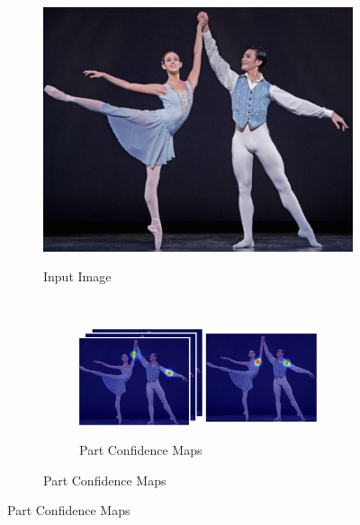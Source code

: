 \begin{figure}[t!]
  \begin{subfigure}[t]{0.24\textwidth}
    \includegraphics[width=0.9\linewidth]{img/openpose_pipeline_a}
    \label{fig:oppA}
    \caption{Input Image}
  \end{subfigure}%
  ~
  \begin{subfigure}[t]{0.24\textwidth}
    \centering
    \begin{subfigure}[b]{1\textwidth}
      \includegraphics[width=0.9\linewidth]{img/openpose_pipeline_b}
      \label{fig:oppB}
      \caption{Part Confidence Maps}
    \end{subfigure}
    

\end{subfigure}
\end{figure}
